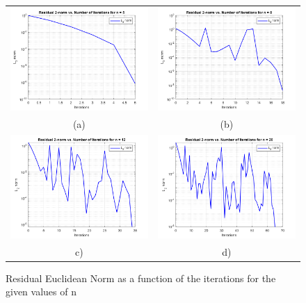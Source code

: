 \documentclass[a4paper,11pt]{article}
\begin{document}
\begin{figure}[!ht]
	\centering
	\begin{tabular}{cc}
		\includegraphics[width=.55\textwidth]{Hillbert_norm_n5} &\hspace{-25pt} \includegraphics[width=.55\textwidth]{Hillbert_norm_n8} \\
		(a) & (b)\\
		\includegraphics[width=.55\textwidth]{Hillbert_norm_n12} &\hspace{-25pt} \includegraphics[width=.55\textwidth]{Hillbert_norm_n20} \\
		c) & d)\\
	\end{tabular}
	\caption{Residual Euclidean Norm as a function of the iterations for the given values of n}
	\label{}
\end{figure}
\clearpage
\end{document}
